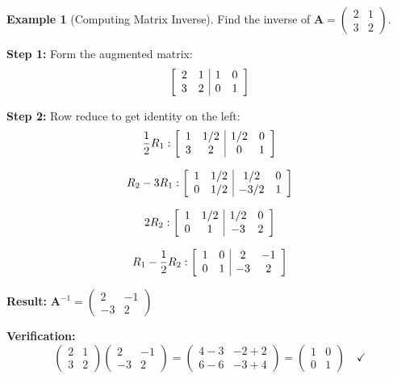\documentclass[12pt]{article}
\numberwithin{equation}{section}
\newcommand{\mat}[1]{\mathbf{#1}}        %
\newenvironment{amatrix}[1]{%
  \left[\begin{array}{#1}}
  {\end{array}\right]}
\theoremstyle{plain}
\theoremstyle{definition}
\newtheorem{example}[theorem]{Example}
\theoremstyle{remark}
\begin{document}
\begin{example}[Computing Matrix Inverse]
Find the inverse of $\mat{A} = \begin{pmatrix} 2 & 1 \\ 3 & 2 \end{pmatrix}$.

\textbf{Step 1:} Form the augmented matrix:
$$\begin{amatrix}{cc|cc}
2 & 1 & 1 & 0\\
3 & 2 & 0 & 1
\end{amatrix}$$

\textbf{Step 2:} Row reduce to get identity on the left:
$$\frac{1}{2}R_1: \begin{amatrix}{cc|cc}
1 & 1/2 & 1/2 & 0\\
3 & 2 & 0 & 1
\end{amatrix}$$

$$R_2 - 3R_1: \begin{amatrix}{cc|cc}
1 & 1/2 & 1/2 & 0\\
0 & 1/2 & -3/2 & 1
\end{amatrix}$$

$$2R_2: \begin{amatrix}{cc|cc}
1 & 1/2 & 1/2 & 0\\
0 & 1 & -3 & 2
\end{amatrix}$$

$$R_1 - \frac{1}{2}R_2: \begin{amatrix}{cc|cc}
1 & 0 & 2 & -1\\
0 & 1 & -3 & 2
\end{amatrix}$$

\textbf{Result:} $\mat{A}^{-1} = \begin{pmatrix} 2 & -1 \\ -3 & 2 \end{pmatrix}$

\textbf{Verification:}
$$\begin{pmatrix} 2 & 1 \\ 3 & 2 \end{pmatrix}\begin{pmatrix} 2 & -1 \\ -3 & 2 \end{pmatrix} = \begin{pmatrix} 4-3 & -2+2 \\ 6-6 & -3+4 \end{pmatrix} = \begin{pmatrix} 1 & 0 \\ 0 & 1 \end{pmatrix} \quad \checkmark$$
\end{example}
\end{document}
